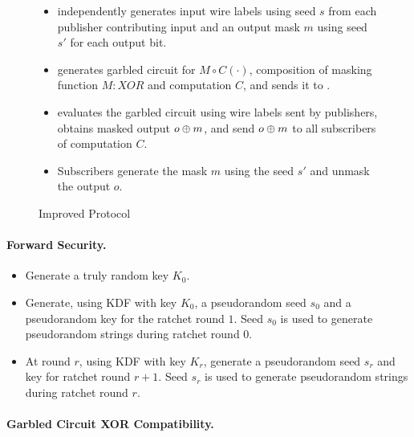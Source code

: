 \begin{figure}[h]
\begin{mdframed}[style=myframe]
\begin{itemize}[leftmargin=*]
	\item \garbler independently generates input wire labels using seed $s$ from
		each publisher contributing input and an output mask $m$ using seed $s'$
		for each output bit.

	\item \garbler generates garbled circuit for $M \circ C(\cdot)$, composition
		of masking function $M:XOR$ and computation $C$, and sends it to \broker.

	\item \broker evaluates the garbled circuit using wire labels sent by
		publishers, obtains masked output $o \oplus m$, and send $o \oplus m$ to all
		subscribers of computation $C$.
  
	\item Subscribers generate the mask $m$ using the seed $s'$ and unmask the
		output $o$.

\end{itemize}

\end{mdframed}
\caption{Improved Protocol}
\label{fig:basicprotocol}
\end{figure}

\paragraph{Forward Security.}


\begin{itemize}[leftmargin=*]

		\item Generate a truly random key $K_0$.

		\item Generate, using KDF with key $K_0$, a pseudorandom seed $s_0$ and a
			pseudorandom key for the ratchet round $1$. Seed $s_0$ is used to
			generate pseudorandom strings during ratchet round $0$.

		\item At round $r$, using KDF with key $K_r$, generate a pseudorandom seed
			$s_r$ and key for ratchet round $r+1$. Seed $s_r$ is used to generate
			pseudorandom strings during ratchet round $r$.

\end{itemize}

\paragraph{Garbled Circuit XOR Compatibility.}


